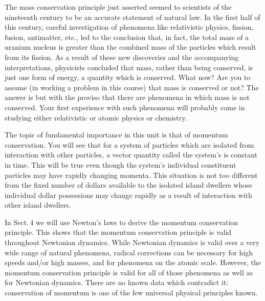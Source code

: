 {
The mass conservation principle just asserted seemed to scientists of the
nineteenth century to be an accurate statement of natural law.
In the first half of this century, careful investigation of phenomena like
relativistic physics, fission, fusion, antimatter, etc., led to the
conclusion that, in fact, the total mass of a uranium nucleus is greater than
the combined mass of the particles which result from its fission.
As a result of these new discoveries and the accompanying interpretations,
physicists concluded that mass, rather than being conserved, is just one form
of energy, a quantity which is conserved.
%
%
What now?
Are you to assume (in working a problem in this course) that mass is
conserved or not?
The answer is  but with the proviso that there are phenomena in which
mass is not conserved.
Your first experience with such phenomena will probably come in studying
either relativistic or atomic physics or chemistry.
%
%

The topic of fundamental importance in this unit is that of momentum
conservation.
You will see that for a system of particles which are isolated from
interaction with other particles, a vector quantity called the system's
 is constant in time.
This will be true even though the system's individual constituent particles
may have rapidly changing momenta.
This situation is not too different from the fixed number of dollars
available to the isolated island dwellers whose individual dollar
possessions may change rapidly as a result of interaction with other island
dwellers.

In Sect.\,4 we will use Newton's laws
 to derive the momentum conservation
principle.
This shows that the momentum conservation principle is valid throughout
Newtonian dynamics.
While Newtonian dynamics is valid over a very wide range of natural
phenomena,
%
%
radical corrections can be necessary for high speeds and/or high masses, and
for phenomena on the atomic scale.
However, the momentum conservation principle is valid for all of those
phenomena as well as for Newtonian dynamics.
There are no known data which contradict it: conservation of momentum is one
of the few universal physical principles known.
}%
